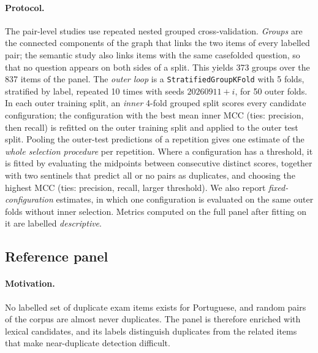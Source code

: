 \paragraph{Protocol.} The pair-level studies use repeated nested grouped
cross-validation. \emph{Groups} are the connected components of the graph
that links the two items of every labelled pair; the semantic study also
links items with the same casefolded question, so that no question appears on
both sides of a split. This yields 373 groups over the 837 items of the panel.
The \emph{outer loop} is a \texttt{StratifiedGroupKFold} with 5 folds,
stratified by label, repeated 10 times with seeds $20260911+i$, for 50 outer
folds. In each outer training split, an \emph{inner} 4-fold grouped split
scores every candidate configuration; the configuration with the best mean
inner MCC (ties: precision, then recall) is refitted on the outer training
split and applied to the outer test split. Pooling the outer-test predictions
of a repetition gives one estimate of the \emph{whole selection procedure}
per repetition. Where a configuration has a threshold, it is fitted by
evaluating the midpoints between consecutive distinct scores, together with
two sentinels that predict all or no pairs as duplicates, and choosing the
highest MCC (ties: precision, recall, larger threshold). We also report
\emph{fixed-configuration} estimates, in which one configuration is evaluated
on the same outer folds without inner selection. Metrics computed on the full
panel after fitting on it are labelled \emph{descriptive}.

\subsection{Reference panel}
\label{app:dedup-panel}

\paragraph{Motivation.} No labelled set of duplicate exam items exists for
Portuguese, and random pairs of the corpus are almost never duplicates. The
panel is therefore enriched with lexical candidates, and its labels
distinguish duplicates from the related items that make near-duplicate
detection difficult.

